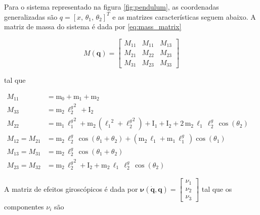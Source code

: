 Para o sistema representado na figura \ref{fig:pendulum}, as coordenadas generalizadas são $q = [x, \, \theta_1, \, \theta_2]^T$ e as matrizes características seguem abaixo. A matriz de massa do sistema é dada por \eqref{eq:mass_matrix}

    \begin{equation}
        M(\mathbf{q}) = 
        \begin{bmatrix}
            M_{11} & M_{11} & M_{13} \\
            M_{21} & M_{22} & M_{23}\\
            M_{31} & M_{23} & M_{33}
        \end{bmatrix}
        \label{eq:mass_matrix}
    \end{equation}
    
    tal que
    
    \begin{subequations}
         \begin{align}
            M_{11} &= \mathrm{m_0} + \mathrm{m_1} + \mathrm{m_2} \\
            M_{33} &= \mathrm{m_2}\, {\ell_{2}^g}^2\, + \mathrm{I_2} \\
            M_{22} &= \mathrm{m_1}\, {\ell_{1}^g}^2 + \mathrm{m_2}\, ({\mathrm{\ell_1}}^2 + {\ell_{2}^g}^2) + \mathrm{I_1} + \mathrm{I_2} + 2\, \mathrm{m_2}\, \mathrm{\ell_1}\, \ell_{2}^g\, \cos\!\left(\theta_2\right) \\
            M_{12} = M_{21} &= \mathrm{m_2}\, \ell_{2}^g\, \cos\!\left(\theta_1 + \theta_2\right) + (\mathrm{m_2}\,\mathrm{\ell_1} + \mathrm{m_1}\,\ell_{1}^g\,) \cos\!\left(\theta_1\right) \\
            M_{13} = M_{31} &= \mathrm{m_2}\, \ell_{2}^g\, \cos\!\left(\theta_1 + \theta_2\right) \\
            M_{23} = M_{32} &= \mathrm{m_2}\, {\ell_{2}^g}^2 + \mathrm{I_2} + \mathrm{m_2}\,\mathrm{\ell_1}\, \ell_{2}^g \, \cos\!\left(\theta_2\right)
         \end{align}
         \phantom{\hspace{6cm}}
    \end{subequations}
    
    A matriz de efeitos giroscópicos é dada por $\mathbf{\nu}(\mathbf{\dot q}, \mathbf{q}) = \begin{bmatrix}  \nu_1 \\ \nu_2 \\\nu_3 \end{bmatrix}$ tal que os componentes $\nu_i$ são
    
